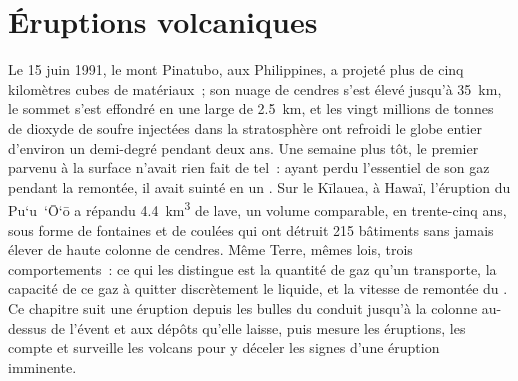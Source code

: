 \chapter{Éruptions volcaniques}\label{ch:b2:eruptive-styles}

Le 15 juin 1991, le mont Pinatubo, aux Philippines, a projeté plus de cinq
kilomètres cubes de matériaux~; son nuage de cendres s'est élevé jusqu'à
\qty{35}{km}, le sommet s'est effondré en une  large de \qty{2.5}{km}, et les
vingt millions de tonnes de dioxyde de soufre injectées dans la stratosphère ont refroidi le
globe entier d'environ un demi-degré pendant deux ans. Une semaine plus tôt, le premier
 parvenu à la surface n'avait rien fait de tel~: ayant perdu l'essentiel de son
gaz pendant la remontée, il avait suinté en un . Sur le Kīlauea, à Hawaï,
l'éruption du Pu`u~`\=O`\=o a répandu \qty{4.4}{km^3} de lave, un volume comparable,
en trente-cinq ans, sous forme de fontaines et de coulées qui ont détruit 215 bâtiments
sans jamais élever de haute colonne de cendres. Même Terre, mêmes lois, trois comportements~: ce qui les distingue
est la quantité de gaz qu'un  transporte, la capacité de ce gaz à quitter
discrètement le liquide, et la vitesse de remontée du . Ce chapitre suit une éruption
depuis les bulles du conduit jusqu'à la colonne au-dessus de l'évent et aux dépôts qu'elle
laisse, puis mesure les éruptions, les compte et surveille les volcans pour y déceler
les signes d'une éruption imminente.

